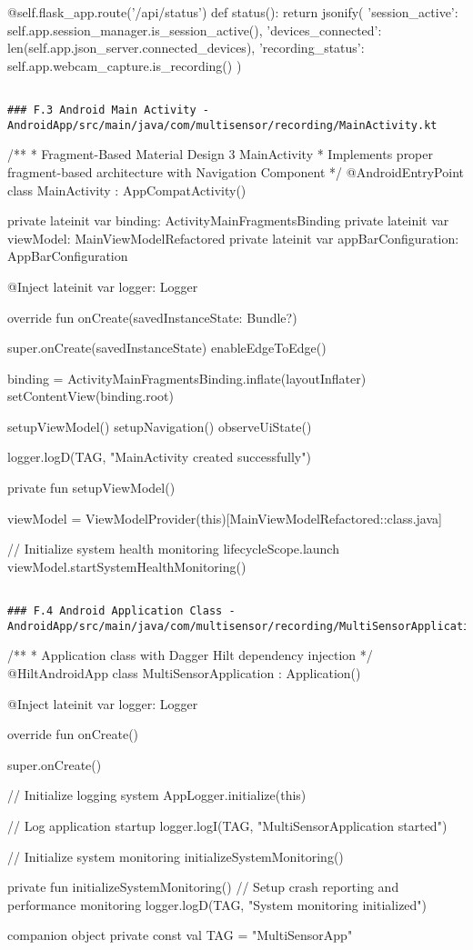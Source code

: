 \documentclass[11pt,a4paper]{report}
\begin{document}
        @self.flask\_app.route('/api/status')
        def status():
            return jsonify({
                'session\_active': self.app.session\_manager.is\_session\_active(),
                'devices\_connected': len(self.app.json\_server.connected\_devices),
                'recording\_status': self.app.webcam\_capture.is\_recording()
            })
\begin{verbatim}

### F.3 Android Main Activity - AndroidApp/src/main/java/com/multisensor/recording/MainActivity.kt

\end{verbatim}
/**
 * Fragment-Based Material Design 3 MainActivity
 * Implements proper fragment-based architecture with Navigation Component
 */
@AndroidEntryPoint
class MainActivity : AppCompatActivity() {

    private lateinit var binding: ActivityMainFragmentsBinding
    private lateinit var viewModel: MainViewModelRefactored
    private lateinit var appBarConfiguration: AppBarConfiguration

    @Inject
    lateinit var logger: Logger

    override fun onCreate(savedInstanceState: Bundle?) {
        super.onCreate(savedInstanceState)
        enableEdgeToEdge()

        binding = ActivityMainFragmentsBinding.inflate(layoutInflater)
        setContentView(binding.root)

        setupViewModel()
        setupNavigation()
        observeUiState()

        logger.logD(TAG, "MainActivity created successfully")
    }

    private fun setupViewModel() {
        viewModel = ViewModelProvider(this)[MainViewModelRefactored::class.java]

        // Initialize system health monitoring
        lifecycleScope.launch {
            viewModel.startSystemHealthMonitoring()
        }
    }
}
\begin{verbatim}

### F.4 Android Application Class - AndroidApp/src/main/java/com/multisensor/recording/MultiSensorApplication.kt

\end{verbatim}
/**
 * Application class with Dagger Hilt dependency injection
 */
@HiltAndroidApp
class MultiSensorApplication : Application() {

    @Inject
    lateinit var logger: Logger

    override fun onCreate() {
        super.onCreate()

        // Initialize logging system
        AppLogger.initialize(this)

        // Log application startup
        logger.logI(TAG, "MultiSensorApplication started")

        // Initialize system monitoring
        initializeSystemMonitoring()
    }

    private fun initializeSystemMonitoring() {
        // Setup crash reporting and performance monitoring
        logger.logD(TAG, "System monitoring initialized")
    }

    companion object {
        private const val TAG = "MultiSensorApp"
    }
}
\end{document}
